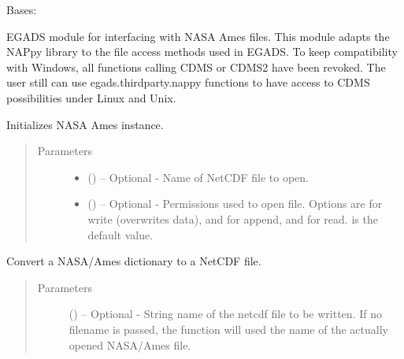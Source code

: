 \documentclass[a4paper,10pt,openany,english]{sphinxmanual}
\begin{document}
\begin{fulllineitems}
\label{egadsapi:egads.input.nasa_ames_io.NasaAmes}
Bases: {\hyperref[egadsapi:egads.input.input_core.FileCore]{}}

EGADS module for interfacing with NASA Ames files. This module adapts the NAPpy 
library to the file access methods used in EGADS. To keep compatibility with
Windows, all functions calling CDMS or CDMS2 have been revoked. The user still
can use egads.thirdparty.nappy functions to have access to CDMS possibilities
under Linux and Unix.

Initializes NASA Ames instance.
\begin{quote}\begin{description}
\item[{Parameters}] \leavevmode\begin{itemize}
\item {} 
 () -- Optional - Name of NetCDF file to open.

\item {} 
 () -- Optional -  Permissions used to open file.
Options are  for write (overwrites data),  and  for append, 
and  for read.  is the default value.

\end{itemize}

\end{description}\end{quote}

\begin{fulllineitems}
\label{egadsapi:egads.input.nasa_ames_io.NasaAmes.convert_to_netcdf}
Convert a NASA/Ames dictionary to a NetCDF file.
\begin{quote}\begin{description}
\item[{Parameters}] \leavevmode
{} () -- Optional - String name of the netcdf file to be written. If no filename is passed, 
the function will used the name of the actually opened NASA/Ames file.


\end{description}
\end{quote}
\end{fulllineitems}
\end{fulllineitems}
\end{document}
